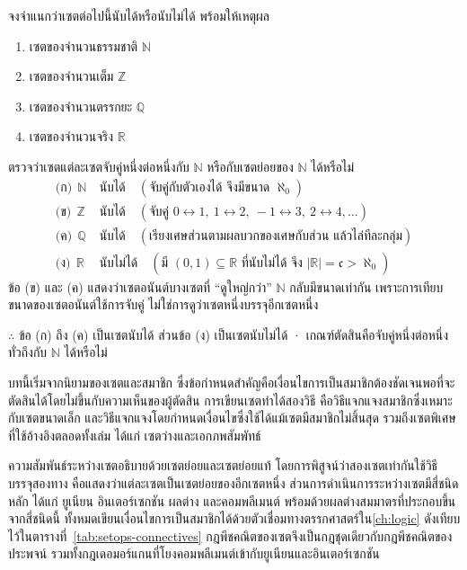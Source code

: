 \begin{ex}
\label{ex:countable-classify}
จงจำแนกว่าเซตต่อไปนี้นับได้หรือนับไม่ได้ พร้อมให้เหตุผล
\begin{enumerate}
    \item เซตของจำนวนธรรมชาติ $\mathbb{N}$
    \item เซตของจำนวนเต็ม $\mathbb{Z}$
    \item เซตของจำนวนตรรกยะ $\mathbb{Q}$
    \item เซตของจำนวนจริง $\mathbb{R}$
\end{enumerate}
\end{ex}
\begin{solution}
ตรวจว่าเซตแต่ละเซตจับคู่หนึ่งต่อหนึ่งกับ $\mathbb{N}$ หรือกับเซตย่อยของ $\mathbb{N}$ ได้หรือไม่
\begin{align*}
\text{(ก)}\ \ \mathbb{N} &\ \text{นับได้} \quad (\text{จับคู่กับตัวเองได้ จึงมีขนาด } \aleph_0)\\
\text{(ข)}\ \ \mathbb{Z} &\ \text{นับได้} \quad (\text{จับคู่ } 0{\leftrightarrow}1,\ 1{\leftrightarrow}2,\ -1{\leftrightarrow}3,\ 2{\leftrightarrow}4,\ldots)\\
\text{(ค)}\ \ \mathbb{Q} &\ \text{นับได้} \quad (\text{เรียงเศษส่วนตามผลบวกของเศษกับส่วน แล้วไล่ทีละกลุ่ม})\\
\text{(ง)}\ \ \mathbb{R} &\ \text{นับไม่ได้} \quad (\text{มี } (0,1) \subseteq \mathbb{R} \text{ ที่นับไม่ได้ จึง } |\mathbb{R}| = \mathfrak{c} > \aleph_0)
\end{align*}
ข้อ (ข) และ (ค) แสดงว่าเซตอนันต์บางเซตที่ ``ดูใหญ่กว่า'' $\mathbb{N}$ กลับมีขนาดเท่ากัน เพราะการเทียบขนาดของเซตอนันต์ใช้การจับคู่ ไม่ใช่การดูว่าเซตหนึ่งบรรจุอีกเซตหนึ่ง

$\therefore$ ข้อ (ก) ถึง (ค) เป็นเซตนับได้ ส่วนข้อ (ง) เป็นเซตนับไม่ได้ · เกณฑ์ตัดสินคือจับคู่หนึ่งต่อหนึ่งทั่วถึงกับ $\mathbb{N}$ ได้หรือไม่ \solhere
\end{solution}

บทนี้เริ่มจากนิยามของเซตและสมาชิก ซึ่งข้อกำหนดสำคัญคือเงื่อนไขการเป็นสมาชิกต้องชัดเจนพอที่จะตัดสินได้โดยไม่ขึ้นกับความเห็นของผู้ตัดสิน การเขียนเซตทำได้สองวิธี คือวิธีแจกแจงสมาชิกซึ่งเหมาะกับเซตขนาดเล็ก และวิธีแจกแจงโดยกำหนดเงื่อนไขซึ่งใช้ได้แม้เซตมีสมาชิกไม่สิ้นสุด รวมถึงเซตพิเศษที่ใช้อ้างอิงตลอดทั้งเล่ม ได้แก่ เซตว่างและเอกภพสัมพัทธ์

ความสัมพันธ์ระหว่างเซตอธิบายด้วยเซตย่อยและเซตย่อยแท้ โดยการพิสูจน์ว่าสองเซตเท่ากันใช้วิธีบรรจุสองทาง คือแสดงว่าแต่ละเซตเป็นเซตย่อยของอีกเซตหนึ่ง ส่วนการดำเนินการระหว่างเซตมีสี่ชนิดหลัก ได้แก่ ยูเนียน อินเตอร์เซกชัน ผลต่าง และคอมพลีเมนต์ พร้อมด้วยผลต่างสมมาตรที่ประกอบขึ้นจากสี่ชนิดนี้ ทั้งหมดเขียนเงื่อนไขการเป็นสมาชิกได้ด้วยตัวเชื่อมทางตรรกศาสตร์ใน\autoref{ch:logic} ดังเทียบไว้ในตารางที่~\ref{tab:setops-connectives} กฎพีชคณิตของเซตจึงเป็นกฎชุดเดียวกับกฎพีชคณิตของประพจน์ รวมทั้งกฎเดอมอร์แกนที่โยงคอมพลีเมนต์เข้ากับยูเนียนและอินเตอร์เซกชัน

